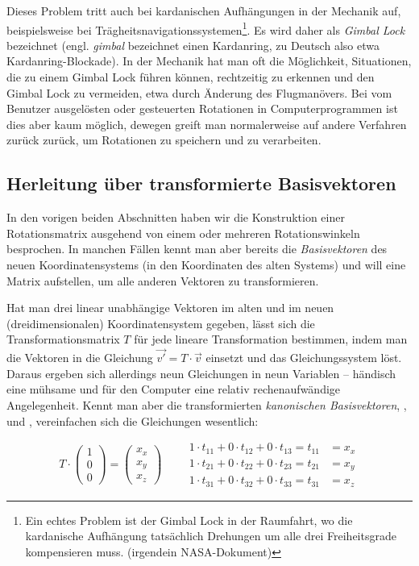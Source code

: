 Dieses Problem tritt auch bei kardanischen Aufhängungen in der Mechanik auf, beispielsweise bei Trägheitsnavigationssystemen\footnote{Ein echtes Problem ist der Gimbal Lock in der Raumfahrt, wo die kardanische Aufhängung tatsächlich Drehungen um alle drei Freiheitsgrade kompensieren muss. (\vgl irgendein NASA-Dokument)}. Es wird daher als \emph{Gimbal Lock} bezeichnet (engl. \emph{gimbal} bezeichnet einen Kardanring, zu Deutsch also etwa Kardanring-Blockade). In der Mechanik hat man oft die Möglichkeit, Situationen, die zu einem Gimbal Lock führen können, rechtzeitig zu erkennen und den Gimbal Lock zu vermeiden, etwa durch Änderung des Flugmanövers. Bei vom Benutzer ausgelösten oder gesteuerten Rotationen in Computerprogrammen ist dies aber kaum möglich, dewegen greift man normalerweise auf andere Verfahren zurück zurück, um Rotationen zu speichern und zu verarbeiten.

\subsection{Herleitung über transformierte Basisvektoren}
\label{rotationbasevectors}
In den vorigen beiden Abschnitten haben wir die Konstruktion einer Rotationsmatrix ausgehend von einem oder mehreren Rotationswinkeln besprochen. In manchen Fällen kennt man aber bereits die \emph{Basisvektoren} des neuen Koordinatensystems (in den Koordinaten des alten Systems) und will eine Matrix aufstellen, um alle anderen Vektoren zu transformieren.

Hat man drei linear unabhängige Vektoren im alten und im neuen (dreidimensionalen) Koordinatensystem gegeben, lässt sich die Transformationsmatrix $T$ für jede lineare Transformation bestimmen, indem man die Vektoren in die Gleichung $\vec{v'} = T \cdot \vec v$ einsetzt und das Gleichungssystem löst. Daraus ergeben sich allerdings neun Gleichungen in neun Variablen -- händisch eine mühsame und für den Computer eine relativ rechenaufwändige Angelegenheit. Kennt man aber die transformierten \emph{kanonischen Basisvektoren}, ,  und , vereinfachen sich die Gleichungen wesentlich:

\begin{equation}
 T \cdot \begin{pmatrix} 1 \\ 0 \\ 0 \end{pmatrix} = \begin{pmatrix} x_x \\ x_y \\ x_z \end{pmatrix} \qquad 
\begin{aligned}
 1 \cdot t_{11} + 0 \cdot t_{12} + 0 \cdot t_{13} = t_{11} &= x_x \\
 1 \cdot t_{21} + 0 \cdot t_{22} + 0 \cdot t_{23} = t_{21} &= x_y \\
 1 \cdot t_{31} + 0 \cdot t_{32} + 0 \cdot t_{33} = t_{31} &= x_z
\end{aligned}
\end{equation}

